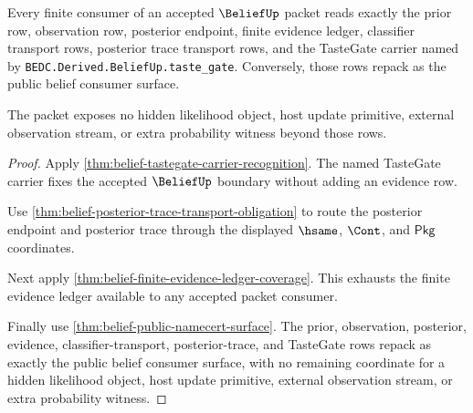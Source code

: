 \begin{theorem}
\label{thm:belief-finite-evidence-consumer-completeness}
Every finite consumer of an accepted $\BeliefUp$ packet reads exactly the prior
row, observation row, posterior endpoint, finite evidence ledger, classifier
transport rows, posterior trace transport rows, and the TasteGate carrier named
by \texttt{BEDC.Derived.BeliefUp.taste\_gate}. Conversely, those rows repack as
the public belief consumer surface.

The packet exposes no hidden likelihood object, host update primitive, external
observation stream, or extra probability witness beyond those rows.
\end{theorem}
\begin{proof}
Apply \autoref{thm:belief-tastegate-carrier-recognition}. The named TasteGate
carrier fixes the accepted $\BeliefUp$ boundary without adding an evidence row.

Use \autoref{thm:belief-posterior-trace-transport-obligation} to route the
posterior endpoint and posterior trace through the displayed $\hsame$, $\Cont$,
and $\mathsf{Pkg}$ coordinates.

Next apply \autoref{thm:belief-finite-evidence-ledger-coverage}. This exhausts
the finite evidence ledger available to any accepted packet consumer.

Finally use \autoref{thm:belief-public-namecert-surface}. The prior,
observation, posterior, evidence, classifier-transport, posterior-trace, and
TasteGate rows repack as exactly the public belief consumer surface, with no
remaining coordinate for a hidden likelihood object, host update primitive,
external observation stream, or extra probability witness.
\end{proof}


